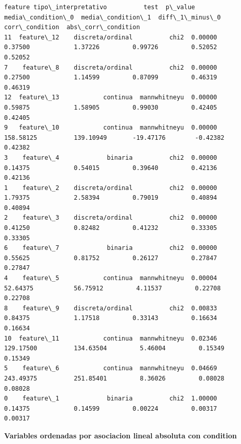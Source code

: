 \documentclass[11pt]{article}
\begin{document}
    \begin{Verbatim}[commandchars=\\\{\}]
       feature tipo\_interpretativo          test  p\_value  media\_condition\_0  media\_condition\_1  diff\_1\_minus\_0  corr\_condition  abs\_corr\_condition
11  feature\_12    discreta/ordinal          chi2  0.00000            0.37500            1.37226         0.99726         0.52052             0.52052
7    feature\_8    discreta/ordinal          chi2  0.00000            0.27500            1.14599         0.87099         0.46319             0.46319
12  feature\_13            continua  mannwhitneyu  0.00000            0.59875            1.58905         0.99030         0.42405             0.42405
9   feature\_10            continua  mannwhitneyu  0.00000          158.58125          139.10949       -19.47176        -0.42382             0.42382
3    feature\_4             binaria          chi2  0.00000            0.14375            0.54015         0.39640         0.42136             0.42136
1    feature\_2    discreta/ordinal          chi2  0.00000            1.79375            2.58394         0.79019         0.40894             0.40894
2    feature\_3    discreta/ordinal          chi2  0.00000            0.41250            0.82482         0.41232         0.33305             0.33305
6    feature\_7             binaria          chi2  0.00000            0.55625            0.81752         0.26127         0.27847             0.27847
4    feature\_5            continua  mannwhitneyu  0.00004           52.64375           56.75912         4.11537         0.22708             0.22708
8    feature\_9    discreta/ordinal          chi2  0.00833            0.84375            1.17518         0.33143         0.16634             0.16634
10  feature\_11            continua  mannwhitneyu  0.02346          129.17500          134.63504         5.46004         0.15349             0.15349
5    feature\_6            continua  mannwhitneyu  0.04669          243.49375          251.85401         8.36026         0.08028             0.08028
0    feature\_1             binaria          chi2  1.00000            0.14375            0.14599         0.00224         0.00317             0.00317
    \end{Verbatim}

    
    \textbf{Variables ordenadas por asociacion lineal absoluta con
condition}

    
    
\end{document}
